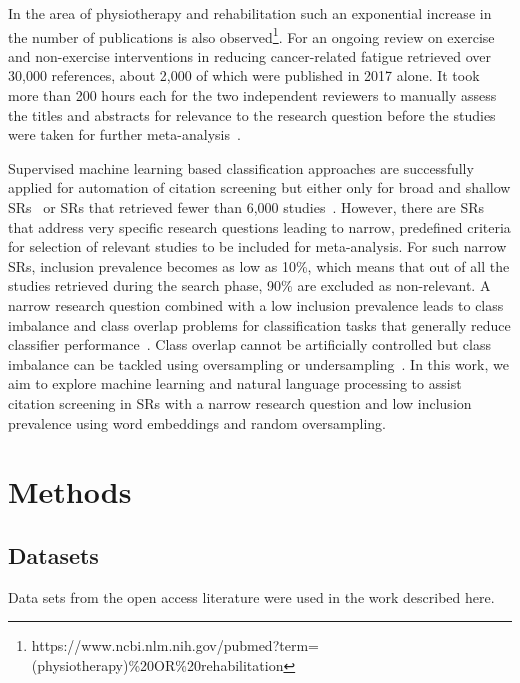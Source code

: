 \documentclass{IOS-Book-Article}
\begin{document}
In the area of physiotherapy and rehabilitation such an exponential increase in the number of publications is also observed\footnote{https://www.ncbi.nlm.nih.gov/pubmed?term=(physiotherapy)\%20OR\%20rehabilitation}.
For an ongoing review on exercise and non-exercise interventions in reducing cancer-related fatigue retrieved over 30,000 references, about 2,000 of which were published in 2017 alone. It took more than 200 hours each for the two independent reviewers to manually assess the titles and abstracts for relevance to the research question before the studies were taken for further meta-analysis~\cite{Hilfiker651}.

Supervised machine learning based classification approaches are successfully applied for automation of citation screening but either only for broad and shallow SRs~\cite{pmid30646959} or SRs that retrieved fewer than 6,000 studies~\cite{Lerner2019-tj}.
However, there are SRs that address very specific research questions leading to narrow, predefined criteria for selection of relevant studies to be included for meta-analysis.
For such narrow SRs, inclusion prevalence becomes as low as 10\%, which means that out of all the studies retrieved during the search phase, 90\% are excluded as non-relevant.
A narrow research question combined with a low inclusion prevalence leads to class imbalance and class overlap problems for classification tasks that generally reduce classifier performance~\cite{Garcia2006-wn}.
Class overlap cannot be artificially controlled but class imbalance can be tackled using oversampling or undersampling~\cite{pmid25738806}.
In this work, we aim to explore machine learning and natural language processing to assist citation screening in SRs with a narrow research question and low inclusion prevalence using word embeddings and random oversampling.
%
\section{Methods}
%
\subsection{Datasets}
%
Data sets from the open access literature were used in the work described here.
%
\end{document}
